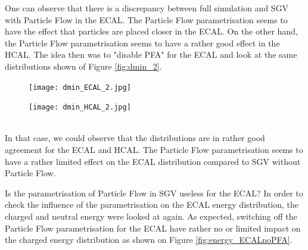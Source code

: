 \documentclass[a4paper,12pt]{article}
\begin{document}
One can observe that there is a discrepancy between full simulation and SGV with Particle Flow in the ECAL. The Particle Flow parametrisation seems to have the effect that particles are placed closer in the ECAL. On the other hand, the Particle Flow parametrisation seems to have a rather good effect in the HCAL. The idea then was to "disable PFA" for the ECAL and look at the same distributions shown of Figure \ref{fig:dmin_2}.  

\noindent
\begin{minipage}{\linewidth}
\centering
\begin{minipage}{0.4\linewidth}
\begin{figure}[H]
    \texttt{[image: dmin\_ECAL\_2.jpg]}
\end{figure}
\end{minipage}
      \hspace{0.05\linewidth}
      \begin{minipage}{0.4\linewidth}
\begin{figure}[H]
    \texttt{[image: dmin\_HCAL\_2.jpg]} 
\end{figure}
\end{minipage}
 \label{fig:dmin_2}
\end{minipage}\\[0.5cm]

In that case, we could observe that the distributions are in rather good agreement for the ECAL and HCAL. The Particle Flow parametrisation seems to have a rather limited effect on the ECAL distribution compared to SGV without Particle Flow. 

Is the parametrisation of Particle Flow in SGV useless for the ECAL? In order to check the influence of the parametrisation on the ECAL energy distribution, the charged and neutral energy were looked at again. As expected, switching off the Particle Flow parametrisation for the ECAL have rather no or limited impact on the charged energy distribution as shown on Figure \ref{fig:energy_ECALnoPFA}.
\end{document}
